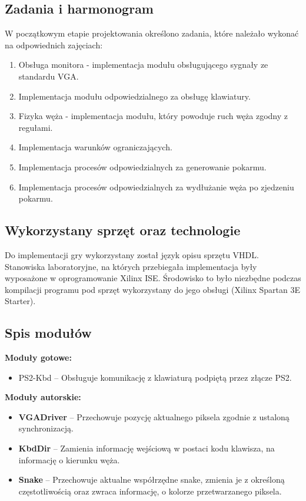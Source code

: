 \documentclass[12pt]{article}
\begin{document}
\subsection{Zadania i harmonogram}
W początkowym etapie projektowania określono zadania, które należało wykonać 
na odpowiednich zajęciach:
\begin{enumerate}
    \item Obsługa monitora - implementacja modułu obsługującego sygnały ze standardu VGA.
    \item Implementacja modułu odpowiedzialnego za obsługę klawiatury.
    \item Fizyka węża - implementacja modułu, który powoduje ruch węża zgodny z regułami. 
    \item Implementacja warunków ograniczających.
    \item Implementacja procesów odpowiedzialnych za generowanie pokarmu.
    \item Implementacja procesów odpowiedzialnych za wydłużanie węża po zjedzeniu pokarmu.
\end{enumerate}
\subsection{Wykorzystany sprzęt oraz technologie}
Do implementacji gry wykorzystany został język opisu sprzętu VHDL. Stanowiska laboratoryjne, 
na których przebiegała implementacja były wyposażone w oprogramowanie Xilinx ISE. 
Środowisko to było niezbędne podczas kompilacji programu pod sprzęt wykorzystany 
do jego obsługi (Xilinx Spartan 3E Starter). 
\subsection{Spis modułów}
\textbf{Moduły gotowe:}
\begin{itemize}
    \item PS2-Kbd – Obsługuje komunikację z klawiaturą podpiętą przez złącze PS2.
\end{itemize}
\textbf{Moduły autorskie:}
\begin{itemize}
    \item \textbf{VGADriver} – Przechowuje pozycję aktualnego piksela zgodnie z ustaloną 
    synchronizacją.
    \item \textbf{KbdDir} – Zamienia informację wejściową w postaci kodu klawisza,
     na informację o kierunku węża.
    \item \textbf{Snake} – Przechowuje aktualne współrzędne snake, zmienia je z 
    określoną częstotliwością oraz zwraca informację, o kolorze przetwarzanego piksela.
\end{itemize}
\end{document}
